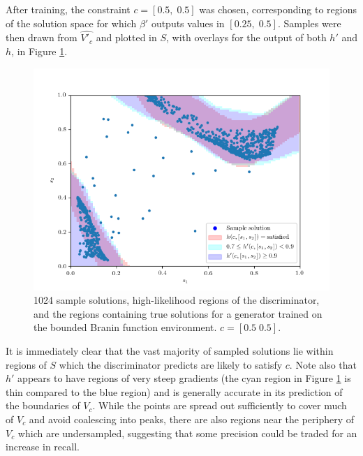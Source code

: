 \documentclass[../../main.tex]{subfiles}
\begin{document}
After training, the constraint $c=[0.5,\;0.5]$ was chosen, corresponding to regions of the solution space for which $\beta'$ outputs values in $[0.25,\;0.5]$.
Samples were then drawn from $\hat{V'_c}$ and plotted in $S$, with overlays for the output of both $h'$ and $h$, in Figure \ref{fig:equality05}.
\begin{figure}[H]
    \begin{center}
    \includegraphics[width=\textwidth]{equality05}
    \caption{
        1024 sample solutions, high-likelihood regions of the discriminator, and the regions containing true solutions for a generator trained on the bounded Branin function environment.
        $c=[0.5\;0.5]$.
    }
    \label{fig:equality05}
    \end{center}
\end{figure}
It is immediately clear that the vast majority of sampled solutions lie within regions of $S$ which the discriminator predicts are likely to satisfy $c$.
Note also that $h'$ appears to have regions of very steep gradients (the cyan region in Figure \ref{fig:equality05} is thin compared to the blue region) and is generally accurate in its prediction of the boundaries of $V_c$.
While the points are spread out sufficiently to cover much of $V_c$ and avoid coalescing into peaks, there are also regions near the periphery of $V_c$ which are undersampled, suggesting that some precision could be traded for an increase in recall.
\end{document}

